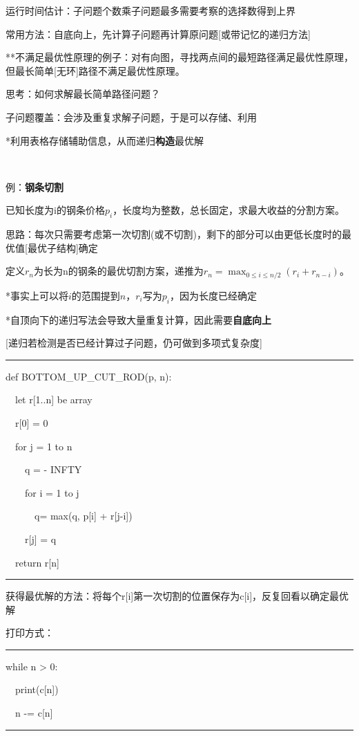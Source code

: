 \documentclass[a4paper,UTF8,fontset=windows]{ctexart}
\newenvironment{code}{\rule{36em}{0.1em}\setlength{\parindent}{1em}

}{

\setlength{\parindent}{0em}\rule{36em}{0.1em}}
\begin{document}
运行时间估计：子问题个数乘子问题最多需要考察的选择数得到上界

常用方法：自底向上，先计算子问题再计算原问题[或带记忆的递归方法]

**\hspace{0em}不满足最优性原理的例子：对有向图，寻找两点间的最短路径满足最优性原理，但最长简单[无环]路径不满足最优性原理。

思考：如何求解最长简单路径问题？

子问题覆盖：会涉及重复求解子问题，于是可以存储、利用

*\hspace{0em}利用表格存储辅助信息，从而递归\textbf{构造}最优解

\

例：\textbf{钢条切割}

已知长度为i的钢条价格$p_i$，长度均为整数，总长固定，求最大收益的分割方案。

思路：每次只需要考虑第一次切割(或不切割)，剩下的部分可以由更低长度时的最优值[最优子结构]确定

定义$r_n$为长为n的钢条的最优切割方案，递推为$r_n=\max_{0\le i\le n/2}(r_i+r_{n-i})$。

*\hspace{0em}事实上可以将$i$的范围提到$n$，$r_i$写为$p_i$，因为长度已经确定

*\hspace{0em}自顶向下的递归写法会导致大量重复计算，因此需要\textbf{自底向上}

[递归若检测是否已经计算过子问题，仍可做到多项式复杂度]

\begin{code}

def BOTTOM\_UP\_CUT\_ROD(p, n):

\ \ let r[1..n] be array

\ \ r[0] = 0

\ \ for j = 1 to n

\ \ \ \ q = - INFTY

\ \ \ \ for i = 1 to j

\ \ \ \ \ \ q= max(q, p[i] + r[j-i])

\ \ \ \ r[j] = q

\ \ return r[n]
\end{code}

获得最优解的方法：将每个r[i]第一次切割的位置保存为c[i]，反复回看以确定最优解

打印方式：

\begin{code}
while n > 0:

\ \ print(c[n])

\ \ n -= c[n]
\end{code}
\end{document}
